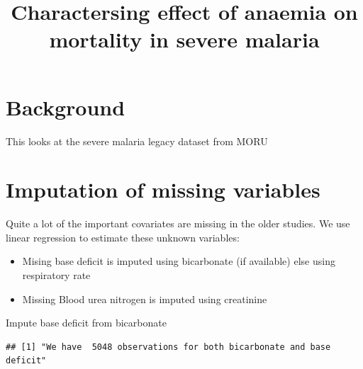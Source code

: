 \documentclass[]{article}
\title{Charactersing effect of anaemia on mortality in severe malaria}
\author{}
\date{}
\newenvironment{Shaded}{\begin{snugshade}}{\end{snugshade}}
\newcommand{\KeywordTok}[1]{\textcolor[rgb]{0.13,0.29,0.53}{\textbf{#1}}}
\newcommand{\StringTok}[1]{\textcolor[rgb]{0.31,0.60,0.02}{#1}}
\newcommand{\OperatorTok}[1]{\textcolor[rgb]{0.81,0.36,0.00}{\textbf{#1}}}
\newcommand{\NormalTok}[1]{#1}
\providecommand{\tightlist}{%
  \setlength{\itemsep}{0pt}\setlength{\parskip}{0pt}}
\begin{document}
\maketitle

{
\setcounter{tocdepth}{2}
\tableofcontents
}
\section{Background}\label{background}

This looks at the severe malaria legacy dataset from MORU

\section{Imputation of missing
variables}\label{imputation-of-missing-variables}

Quite a lot of the important covariates are missing in the older
studies. We use linear regression to estimate these unknown variables:

\begin{itemize}
\tightlist
\item
  Mising base deficit is imputed using bicarbonate (if available) else
  using respiratory rate
\item
  Missing Blood urea nitrogen is imputed using creatinine
\end{itemize}

Impute base deficit from bicarbonate

\begin{Shaded}
\end{Shaded}

\begin{verbatim}
## [1] "We have  5048 observations for both bicarbonate and base deficit"
\end{verbatim}
\end{document}
